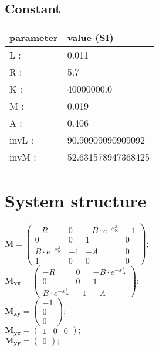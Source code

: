 \documentclass[11pt, oneside]{article}      %
\begin{document}
\subsection{Constant}
%
\begin{center}
%
\begin{tabular}{ll}
%
\hline
parameter & value (SI)
\\ \hline
L :& 0.011
\\
R :& 5.7
\\
K :& 40000000.0
\\
M :& 0.019
\\
A :& 0.406
\\
invL :& 90.90909090909092
\\
invM :& 52.631578947368425
\\
\hline
\end{tabular}
%
\end{center}
%
\section{System structure}
%

%
$ \mathbf{M} = \left(\begin{array}{cccc}- R & 0 & - B \cdot e^{- x_{\mathrm{K}}^{2}} & -1\\0 & 0 & 1 & 0\\B \cdot e^{- x_{\mathrm{K}}^{2}} & -1 & - A & 0\\1 & 0 & 0 & 0\end{array}\right) ; $ 
%
\\
%
$ \mathbf{M_{xx}} = \left(\begin{array}{ccc}- R & 0 & - B \cdot e^{- x_{\mathrm{K}}^{2}}\\0 & 0 & 1\\B \cdot e^{- x_{\mathrm{K}}^{2}} & -1 & - A\end{array}\right) ; $ 
%
\\
%
$ \mathbf{M_{xy}} = \left(\begin{array}{c}-1\\0\\0\end{array}\right) ; $ 
%
\\
%
$ \mathbf{M_{yx}} = \left(\begin{array}{ccc}1 & 0 & 0\end{array}\right) ; $ 
%
\\
%
$ \mathbf{M_{yy}} = \left(\begin{array}{c}0\end{array}\right) ; $ 
%
\\
%
\end{document}
